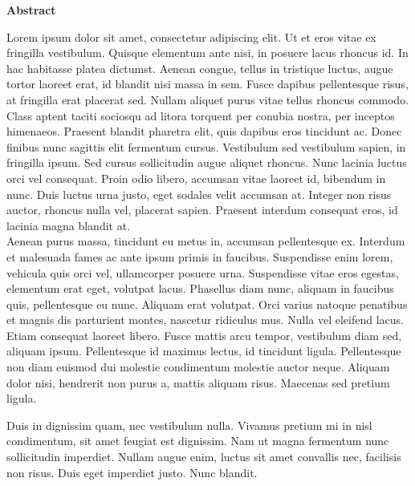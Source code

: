 \centerline{\Large\bfseries Abstract}
\bigskip

Lorem ipsum dolor sit amet, consectetur adipiscing elit. Ut et eros vitae ex fringilla vestibulum. Quisque elementum ante nisi, in posuere lacus rhoncus id. In hac habitasse platea dictumst. Aenean congue, tellus in tristique luctus, augue tortor laoreet erat, id blandit nisi massa in sem. Fusce dapibus pellentesque risus, at fringilla erat placerat sed. Nullam aliquet purus vitae tellus rhoncus commodo. Class aptent taciti sociosqu ad litora torquent per conubia nostra, per inceptos himenaeos. Praesent blandit pharetra elit, quis dapibus eros tincidunt ac. Donec finibus nunc sagittis elit fermentum cursus. Vestibulum sed vestibulum sapien, in fringilla ipsum. Sed cursus sollicitudin augue aliquet rhoncus. Nunc lacinia luctus orci vel consequat. Proin odio libero, accumsan vitae laoreet id, bibendum in nunc. Duis luctus urna justo, eget sodales velit accumsan at. Integer non risus auctor, rhoncus nulla vel, placerat sapien. Praesent interdum consequat eros, id lacinia magna blandit at. \\

Aenean purus massa, tincidunt eu metus in, accumsan pellentesque ex. Interdum et malesuada fames ac ante ipsum primis in faucibus. Suspendisse enim lorem, vehicula quis orci vel, ullamcorper posuere urna. Suspendisse vitae eros egestas, elementum erat eget, volutpat lacus. Phasellus diam nunc, aliquam in faucibus quis, pellentesque eu nunc. Aliquam erat volutpat. Orci varius natoque penatibus et magnis dis parturient montes, nascetur ridiculus mus. Nulla vel eleifend lacus. Etiam consequat laoreet libero. Fusce mattis arcu tempor, vestibulum diam sed, aliquam ipsum. Pellentesque id maximus lectus, id tincidunt ligula. Pellentesque non diam euismod dui molestie condimentum molestie auctor neque. Aliquam dolor nisi, hendrerit non purus a, mattis aliquam risus. Maecenas sed pretium ligula.

Duis in dignissim quam, nec vestibulum nulla. Vivamus pretium mi in nisl condimentum, sit amet feugiat est dignissim. Nam ut magna fermentum nunc sollicitudin imperdiet. Nullam augue enim, luctus sit amet convallis nec, facilisis non risus. Duis eget imperdiet justo. Nunc blandit.

\thispagestyle{empty} %
\newpage
